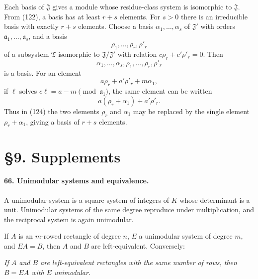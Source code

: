 \documentclass[11pt]{article}
\begin{document}
Each basis of $\mathfrak J$ gives a module whose residue-class system is isomorphic to $\mathfrak J$. From (122), a basis has at least $r+s$ elements. For $s>0$ there is an irreducible basis with exactly $r+s$ elements. Choose a basis $\alpha_1,
\ldots,
\alpha_s$ of $\mathfrak J'$ with orders $\mathfrak a_1,
\ldots,
\mathfrak a_s$, and a basis
\[
  \rho_1,
\ldots,
\rho_r,
\rho'_r
\]
of a subsystem $\mathfrak T$ isomorphic to $\mathfrak J/\mathfrak J'$ with relation $c\rho_r+c'\rho'_r=0$. Then
\begin{equation}
  \alpha_1,
\ldots,
\alpha_s,
\rho_1,
\ldots,
\rho_r,
\rho'_r
\tag{124}
\end{equation}
is a basis. For an element
\begin{equation}
  a\rho_r+a'\rho'_r+m\alpha_1,
\tag{125}
\end{equation}
if $\ell$ solves $c\ell=a-m\pmod{\mathfrak a_1}$, the same element can be written
\[
  a(\rho_r+\alpha_1)+a'\rho'_r.
\]
Thus in (124) the two elements $\rho_r$ and $\alpha_1$ may be replaced by the single element $\rho_r+\alpha_1$, giving a basis of $r+s$ elements.

\section*{\S 9. Supplements}

\paragraph{66. Unimodular systems and equivalence.}
A unimodular system is a square system of integers of $K$ whose determinant is a unit. Unimodular systems of the same degree reproduce under multiplication, and the reciprocal system is again unimodular.

If $A$ is an $m$-rowed rectangle of degree $n$, $E$ a unimodular system of degree $m$, and $EA=B$, then $A$ and $B$ are left-equivalent. Conversely:

\emph{If $A$ and $B$ are left-equivalent rectangles with the same number of rows, then $B=EA$ with $E$ unimodular.}
\end{document}
